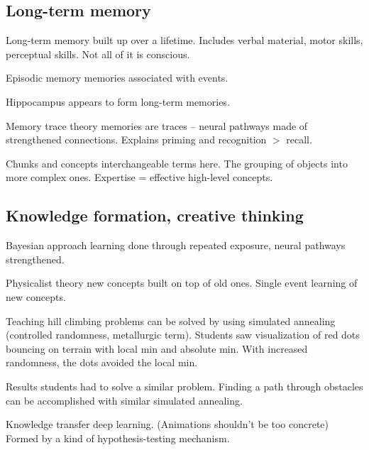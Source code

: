 \begin{mdframed}\begin{multicols}{2}
\subsection{Long-term memory}
\begin{compactdesc}
\item[Long-term memory] built up over a lifetime. Includes verbal material,
    motor skills, perceptual skills. Not all of it is conscious.
\item[Episodic memory] memories associated with events.
\item[Hippocampus] appears to form long-term memories.
\item[Memory trace theory] memories are traces -- neural pathways made of
    strengthened connections. Explains priming and recognition $>$ recall.
\item[Chunks and concepts] interchangeable terms here. The grouping of
    objects into more complex ones. Expertise = effective high-level
    concepts.
\end{compactdesc}


\subsection{Knowledge formation, creative thinking}
\begin{compactdesc}
\item[Bayesian approach] learning done through repeated exposure, neural
    pathways strengthened.
\item[Physicalist theory] new concepts built on top of old ones. Single
    event learning of new concepts.
\item[Teaching] hill climbing problems can be solved by
    using simulated annealing (controlled randomness, metallurgic term).
    Students saw visualization of red dots bouncing on terrain with local
    min and absolute min. With increased randomness, the dots avoided the
    local min.
\item[Results] students had to solve a similar problem. Finding a path
    through obstacles can be accomplished with similar simulated annealing.
\item[Knowledge transfer] deep learning. (Animations shouldn't be too concrete)
    Formed by a kind of hypothesis-testing mechanism.
\end{compactdesc}

\end{multicols}\end{mdframed}






